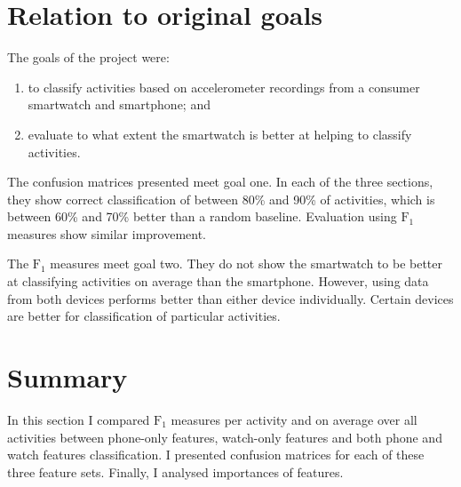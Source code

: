 {{  \section{Relation to original goals}
    The goals of the project were:
    \begin{enumerate}
      \item to classify activities based on accelerometer recordings from a consumer smartwatch and smartphone; and
      \item evaluate to what extent the smartwatch is better at helping to classify activities.
    \end{enumerate}
    
    The confusion matrices presented meet goal one. In each of the three sections, they show correct classification of between 80\% and 90\% of activities, which is between 60\% and 70\% better than a random baseline. Evaluation using $\mathrm{F}_1$ measures show similar improvement.
    
    The $\mathrm{F}_1$ measures meet goal two. They do not show the smartwatch to be better at classifying activities on average than the smartphone. However, using data from both devices performs better than either device individually. Certain devices are better for classification of particular activities.
  \clearpage
  \section{Summary}
    In this section I compared $\mathrm{F}_1$ measures per activity and on average over all activities between phone-only features, watch-only features and both phone and watch features classification. I presented confusion matrices for each of these three feature sets. Finally, I analysed importances of features.
    
}}
